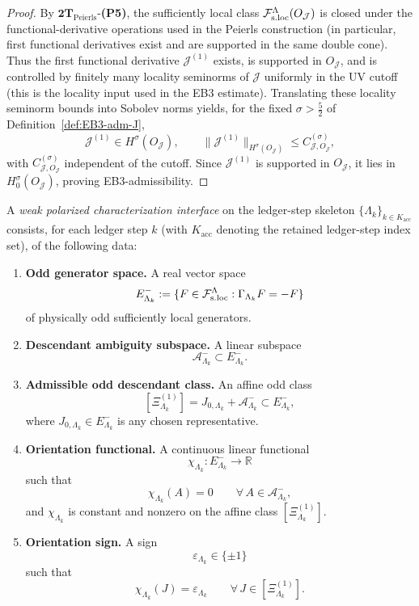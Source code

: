 \begin{proof}
By $\mathbf{2T}_{\mathrm{Peierls}}$-\textbf{(P5)}, the sufficiently local class
$\mathcal F_{\mathrm{s.loc}}^\Lambda(O_{\mathcal J})$ is closed under the functional-derivative operations
used in the Peierls construction (in particular, first functional derivatives
exist and are supported in the same double cone).
Thus the first functional derivative $\mathcal J^{(1)}$ exists, is supported in
$O_{\mathcal J}$, and is controlled by finitely many locality seminorms of
$\mathcal J$ uniformly in the UV cutoff (this is the locality input used in
the EB3 estimate).
Translating these locality seminorm bounds into Sobolev norms yields, for the
fixed $\sigma>\frac52$ of Definition~\ref{def:EB3-adm-J},
\[
\mathcal J^{(1)}\in H^\sigma(O_{\mathcal J}),\qquad
\|\mathcal J^{(1)}\|_{H^\sigma(O_{\mathcal J})}\le C^{(\sigma)}_{\mathcal J,O_{\mathcal J}},
\]
with $C^{(\sigma)}_{\mathcal J,O_{\mathcal J}}$ independent of the cutoff.
Since $\mathcal J^{(1)}$ is supported in $O_{\mathcal J}$, it lies in
$H^\sigma_0(O_{\mathcal J})$, proving EB3-admissibility.
\end{proof}

\begin{definition}
\label{def:2T-char-weak}
A \emph{weak polarized characterization interface} on the ledger-step skeleton
\(\{\Lambda_k\}_{k\in K_{\mathrm{acc}}}\) consists, for each ledger step \(k\)
\textup{(with \(K_{\mathrm{acc}}\) denoting the retained ledger-step index set)},
of the following data:
\begin{enumerate}[label=\textbf{(C\arabic*)},leftmargin=*,itemsep=0.5em]
\item \textbf{Odd generator space.} A real vector space
  \[
  E^-_{\Lambda_k}:=\{F\in\mathcal F_{\mathrm{s.loc}}^\Lambda:\Gamma_{\Lambda_k}F=-F\}
  \]
  of physically odd sufficiently local generators.
\item \textbf{Descendant ambiguity subspace.} A linear subspace
  \[
  \mathcal A^-_{\Lambda_k}
  \subset E^-_{\Lambda_k}.
  \]
\item \textbf{Admissible odd descendant class.} An affine odd class
  \[
  [\Xi^{(1)}_{\Lambda_k}]
  =
  J_{0,\Lambda_k}+\mathcal A^-_{\Lambda_k}
  \subset E^-_{\Lambda_k},
  \]
  where \(J_{0,\Lambda_k}\in E^-_{\Lambda_k}\) is any chosen representative.
\item \textbf{Orientation functional.} A continuous linear functional
  \[
  \chi_{\Lambda_k}:E^-_{\Lambda_k}\to\mathbb R
  \]
  such that
  \[
  \chi_{\Lambda_k}(A)=0
  \qquad
  \forall\,A\in\mathcal A^-_{\Lambda_k},
  \]
  and \(\chi_{\Lambda_k}\) is constant and nonzero on the affine class
  \([\Xi^{(1)}_{\Lambda_k}]\).
\item \textbf{Orientation sign.} A sign
  \[
  \varepsilon_{\Lambda_k}\in\{\pm 1\}
  \]
  such that
  \[
  \chi_{\Lambda_k}(J)=\varepsilon_{\Lambda_k}
  \qquad
  \forall\,J\in[\Xi^{(1)}_{\Lambda_k}].
  \]
\end{enumerate}
\end{definition}

